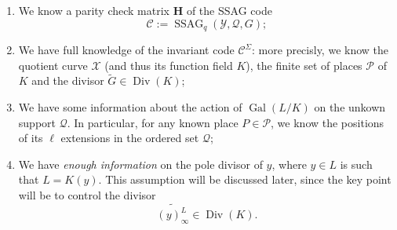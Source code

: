 \documentclass[10pt]{article}
\theoremstyle{definition}
\theoremstyle{definition}
\theoremstyle{definition}
\newcommand{\C}{\mathcal{C}}
\newcommand{\X}{\mathcal{X}}
\newcommand{\Y}{\mathcal{Y}}
\newcommand{\PR}{\mathcal{P}}
\newcommand{\QR}{\mathcal{Q}}
\newcommand{\Div}{\operatorname{Div}}
\newcommand{\Gal}{\operatorname{Gal}}
\newcommand{\ssag}{\operatorname{SSAG}}
\begin{document}
\begin{enumerate}
\item We know a parity check matrix $\mathbf{H}$ of the SSAG code  \[\mathcal{C} := \ssag_q(\Y,\QR,G);\]
\item We have full knowledge of the invariant code $\C^{\Sigma}$: more precisly, we know the quotient curve $\X$ (and thus its function field $K$), the finite set of places $\PR$ of $K$ and the divisor $\tilde{G} \in \Div(K)$;
\item We have some information about the action of $\Gal(L/K)$ on the unkown support $\QR$. In particular, for any known place $P \in \PR$, we know the positions of its $\ell$ extensions in the ordered set $\QR$;
\item We have \emph{enough information} on the pole divisor of $y$, where $y \in L$ is such that $L=K(y)$. This assumption will be discussed later, since the key point will be to control the divisor 
\[\widetilde{(y)^L_{\infty}} \in \Div(K).\] 
\end{enumerate}
\end{document}
